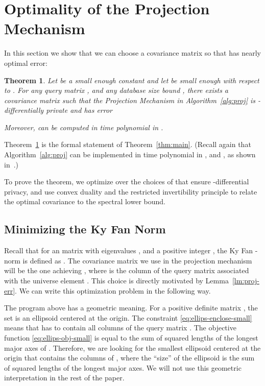 \documentclass{article}
\newtheorem{theorem}{Theorem}[section]
\begin{document}
\section{Optimality of the Projection Mechanism}

In this section we show that we can choose a covariance matrix
 so that  has nearly optimal
error:
\begin{theorem}\label{thm:main-smalldb}
  Let  be a small enough constant and let  be small enough with respect to . For any
  query matrix , and any database size
  bound , there exists a covariance matrix  such
  that the Projection Mechanism  in
  Algorithm~\ref{alg:proj} is -differentially private
  and has error
  
  Moreover,  can be computed in time polynomial in .
\end{theorem}

Theorem~\ref{thm:main-smalldb} is the formal statement of
Theorem~\ref{thm:main}. (Recall again that Algorithm~\ref{alg:proj}
can be implemented in time polynomial in ,  and , as shown in~\cite{NTZ,conjunctions}.)


To prove the theorem, we optimize over the choices of  that
ensure -differential privacy, and use convex duality
and the restricted invertibility principle to relate the optimal
covariance to the spectral lower bound.

\subsection{Minimizing the Ky Fan Norm}

Recall that for an  matrix  with
eigenvalues , and a
positive integer , the Ky Fan -norm is defined as
.  The
covariance matrix  we use in the projection mechanism will be
the one achieving , where  is the column of the query matrix
 associated with the universe element . This choice is directly
motivated by Lemma~\ref{lm:proj-err}.  We can write this optimization
problem in the following way.

The program above has a geometric meaning. For a positive definite
matrix , the set  is an ellipsoid centered at the origin. The constraint
\eqref{eq:ellips-enclose-small} means that  has to contain all
columns of the query matrix . The objective function
\eqref{eq:ellips-obj-small} is equal to the sum of squared lengths of
the  longest major axes of . Therefore, we are looking for
the smallest  ellipsoid centered at the origin that contains the
columns of , where the ``size'' of the ellipsoid is the sum of
squared lengths of the  longest major axes. We will not use this
geometric interpretation in the rest of the paper.
\end{document}
